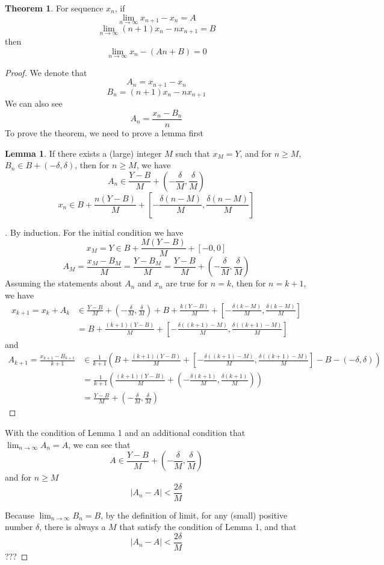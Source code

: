 \documentclass[]{article}
\theoremstyle{definition}\newtheorem{theorem}{Theorem}
\theoremstyle{definition}\newtheorem{lemma}{Lemma}
\newenvironment{subproof}[1][\proofname]{%
  \renewcommand{\qedsymbol}{$\blacksquare$}%
  \begin{proof}[#1]%
}{%
  \end{proof}%
}
\begin{document}
\begin{theorem}
For sequence ${x_n}$, if
\[
\lim_{n\to\infty} x_{n+1} - x_n = A
\]
\[
\lim_{n\to\infty} (n+1)x_n - nx_{n+1} = B
\]
then
\[
\lim_{n\to\infty} x_n - (An+B) = 0
\]
\end{theorem}
\begin{proof}
We denote that
\[
A_n = x_{n+1} - x_n
\]
\[
B_n = (n+1)x_n - nx_{n+1}
\]
We can also see 
\[
A_n = \frac{x_n - B_n}{n}
\]
To prove the theorem, we need to prove a lemma first
\begin{lemma}
If there exists a (large) integer $M$ such that $x_M = Y$, and for $n\geq M$, $B_n \in B + (-\delta, \delta)$, then for $n\geq M$, we have
\[
A_n \in \frac{Y - B}{M} + \left(-\frac{\delta}{M}, \frac{\delta}{M}\right)
\]
\[
x_n \in B + \frac{n(Y - B)}{M} + \left[-\frac{\delta(n-M)}{M}, \frac{\delta(n-M)}{M}\right]
\]
\end{lemma}
\begin{subproof}
By induction. For the initial condition we have
\[
x_M = Y \in B + \frac{M(Y - B)}{M} + \left[-0, 0\right]
\]
\[
A_M = \frac{x_M - B_M}{M} = \frac{Y - B_M}{M} =  \frac{Y - B}{M} + \left(-\frac{\delta}{M}, \frac{\delta}{M}\right)
\]
Assuming the statements about $A_n$ and $x_n$ are true for $n = k$, then for $n = k + 1$, we have
\begin{align*}
x_{k+1} = x_{k} + A_{k} &\in \frac{Y - B}{M} + \left(-\frac{\delta}{M}, \frac{\delta}{M}\right) + B + \frac{k(Y - B)}{M} + \left[-\frac{\delta(k-M)}{M}, \frac{\delta(k-M)}{M}\right]\\
 &= B + \frac{(k + 1)(Y - B)}{M} + \left[-\frac{\delta((k+1)-M)}{M}, \frac{\delta((k+1)-M)}{M}\right]
\end{align*}
and
\begin{align*}
A_{k+1} = \frac{x_{k+1} - B_{k+1}}{k+1} &\in \frac{1}{k+1}\left(B + \frac{(k + 1)(Y - B)}{M} + \left[-\frac{\delta((k+1)-M)}{M}, \frac{\delta((k+1)-M)}{M}\right] - B - (-\delta, \delta)\right)\\
& = \frac{1}{k+1}\left(\frac{(k + 1)(Y - B)}{M} + \left(-\frac{\delta(k+1)}{M}, \frac{\delta(k+1)}{M}\right)  \right)\\
& = \frac{Y - B}{M} + \left(-\frac{\delta}{M}, \frac{\delta}{M}\right)
\end{align*}
\end{subproof}

With the condition of Lemma 1 and an additional condition that $\lim_{n\to\infty}A_n = A$, we can see that
\[
A \in \frac{Y - B}{M} + \left(-\frac{\delta}{M}, \frac{\delta}{M} \right) 
\]
and for $n \geq M$
\[
|A_n - A| < \frac{2\delta}{M}
\]

Because $\lim_{n\to\infty}B_n = B$, by the definition of limit, for any (small) positive number $\delta$, there is always a $M$ that satisfy the condition of Lemma 1, and that
\[
|A_n - A|  < \frac{2\delta}{M}
\]
???

\end{proof}
\end{document}
